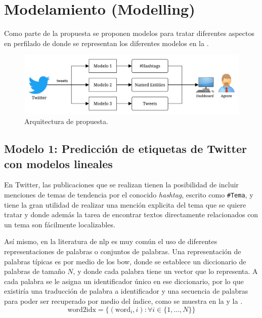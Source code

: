
\section{Modelamiento (Modelling)}
Como parte de la propuesta se proponen \nmodels modelos para tratar diferentes aspectos en perfilado de donde se representan los diferentes modelos en la .

\begin{figure}[H]
  \centering
  \includegraphics[width=\textwidth]{Figures/general-architecture.pdf}
\decoRule
\caption[Arquitectura de propuesta]{Arquitectura de propuesta.}
\label{fig:proposal-arch}
\end{figure}


\subsection{Modelo 1: Predicción de etiquetas de Twitter con modelos lineales} \label{sec:twitter-prediction}
En Twitter, las publicaciones que se realizan tienen la posibilidad de incluir menciones de temas de tendencia por el conocido \emph{hashtag}, escrito como \texttt{\#Tema}, y tiene la gran utilidad de realizar una mención explicita del tema que se quiere tratar y donde además la tarea de encontrar textos directamente relacionados con un tema son fácilmente localizables.

Así mismo, en la literatura de \gls{nlp} es muy común el uso de diferentes representaciones de palabras o conjuntos de palabras. Una representación de palabras típicas es por medio de los \gls{bow}, donde se establece un diccionario de palabras de tamaño $N$, y donde cada palabra tiene un vector que lo representa. A cada palabra se le asigna un identificador único en ese diccionario, por lo que existiría una traducción de palabra a identificador y una secuencia de palabras para poder ser recuperado por medio del índice, como se muestra en la  y la .
\begin{equation} \label{eq:bow-repr1}
  \text{word2idx} = \Big\{(\text{word}_i, i) : \forall i \in \{1, \ldots, N\} \Big\}
\end{equation}

